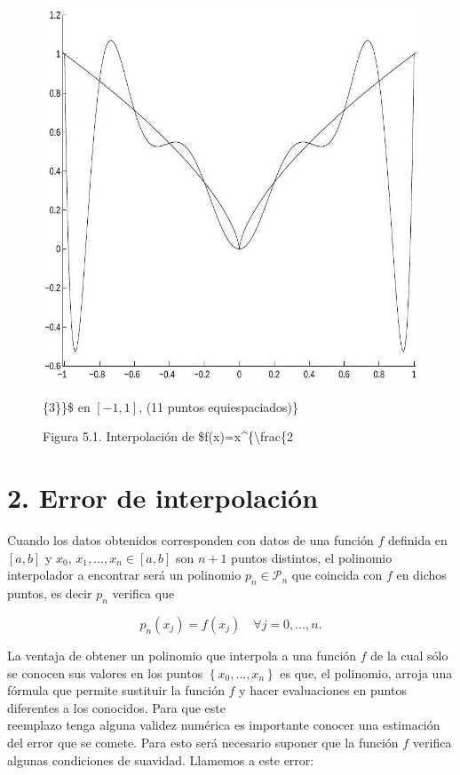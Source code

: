 \documentclass[10pt]{article}
\begin{document}
\begin{figure}[h]
\begin{center}
  \includegraphics[width=\textwidth]{2025_09_05_3888c9ac96bd653d96b4g-096}
\captionsetup{labelformat=empty}
\caption{Figura 5.1. Interpolación de \$f(x)=x\^{}\{\textbackslash frac\{2}\{3\}\}\$ en $[-1,1]$, (11 puntos equiespaciados)\}\end{center}
\end{figure}

\section*{2. Error de interpolación}
Cuando los datos obtenidos corresponden con datos de una función $f$ definida en $[a, b]$ y $x_{0}$, $x_{1}, \ldots, x_{n} \in[a, b]$ son $n+1$ puntos distintos, el polinomio interpolador a encontrar será un polinomio $p_{n} \in \mathcal{P}_{n}$ que coincida con $f$ en dichos puntos, es decir $p_{n}$ verifica que

$$
p_{n}\left(x_{j}\right)=f\left(x_{j}\right) \quad \forall j=0, \ldots, n .
$$

La ventaja de obtener un polinomio que interpola a una función $f$ de la cual sólo se conocen sus valores en los puntos $\left\{x_{0}, \ldots, x_{n}\right\}$ es que, el polinomio, arroja una fórmula que permite sustituir la función $f$ y hacer evaluaciones en puntos diferentes a los conocidos. Para que este\\
reemplazo tenga alguna validez numérica es importante conocer una estimación del error que se comete. Para esto será necesario suponer que la función $f$ verifica algunas condiciones de suavidad. Llamemos a este error:
\end{document}
